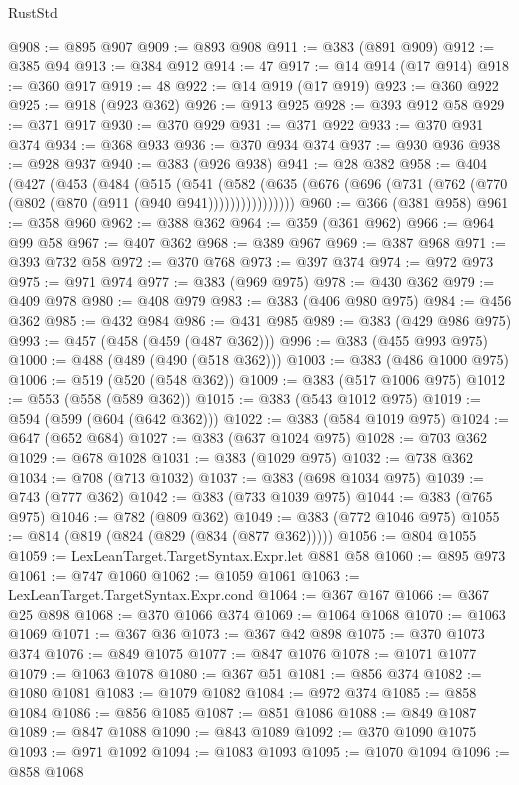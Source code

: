 \begin{lexlean}{RustStd}
\begin{coremodule}
{\begin{coremodule}
{{{{{{{{{{{{{{{{@908 := @895 @907
@909 := @893 @908
@911 := @383 (@891 @909)
@912 := @385 @94
@913 := @384 @912
@914 := 47
@917 := @14 @914 (@17 @914)
@918 := @360 @917
@919 := 48
@922 := @14 @919 (@17 @919)
@923 := @360 @922
@925 := @918 (@923 @362)
@926 := @913 @925
@928 := @393 @912 @58
@929 := @371 @917
@930 := @370 @929
@931 := @371 @922
@933 := @370 @931 @374
@934 := @368 @933
@936 := @370 @934 @374
@937 := @930 @936
@938 := @928 @937
@940 := @383 (@926 @938)
@941 := @28 @382
@958 := @404
    (@427
      (@453
        (@484
          (@515
            (@541
              (@582 (@635 (@676 (@696 (@731 (@762 (@770 (@802 (@870 (@911 (@940 @941))))))))))))))))
@960 := @366 (@381 @958)
@961 := @358 @960
@962 := @388 @362
@964 := @359 (@361 @962)
@966 := @964 @99 @58
@967 := @407 @362
@968 := @389 @967
@969 := @387 @968
@971 := @393 @732 @58
@972 := @370 @768
@973 := @397 @374
@974 := @972 @973
@975 := @971 @974
@977 := @383 (@969 @975)
@978 := @430 @362
@979 := @409 @978
@980 := @408 @979
@983 := @383 (@406 @980 @975)
@984 := @456 @362
@985 := @432 @984
@986 := @431 @985
@989 := @383 (@429 @986 @975)
@993 := @457 (@458 (@459 (@487 @362)))
@996 := @383 (@455 @993 @975)
@1000 := @488 (@489 (@490 (@518 @362)))
@1003 := @383 (@486 @1000 @975)
@1006 := @519 (@520 (@548 @362))
@1009 := @383 (@517 @1006 @975)
@1012 := @553 (@558 (@589 @362))
@1015 := @383 (@543 @1012 @975)
@1019 := @594 (@599 (@604 (@642 @362)))
@1022 := @383 (@584 @1019 @975)
@1024 := @647 (@652 @684)
@1027 := @383 (@637 @1024 @975)
@1028 := @703 @362
@1029 := @678 @1028
@1031 := @383 (@1029 @975)
@1032 := @738 @362
@1034 := @708 (@713 @1032)
@1037 := @383 (@698 @1034 @975)
@1039 := @743 (@777 @362)
@1042 := @383 (@733 @1039 @975)
@1044 := @383 (@765 @975)
@1046 := @782 (@809 @362)
@1049 := @383 (@772 @1046 @975)
@1055 := @814 (@819 (@824 (@829 (@834 (@877 @362)))))
@1056 := @804 @1055
@1059 := LexLeanTarget.TargetSyntax.Expr.let @881 @58
@1060 := @895 @973
@1061 := @747 @1060
@1062 := @1059 @1061
@1063 := LexLeanTarget.TargetSyntax.Expr.cond
@1064 := @367 @167
@1066 := @367 @25 @898
@1068 := @370 @1066 @374
@1069 := @1064 @1068
@1070 := @1063 @1069
@1071 := @367 @36
@1073 := @367 @42 @898
@1075 := @370 @1073 @374
@1076 := @849 @1075
@1077 := @847 @1076
@1078 := @1071 @1077
@1079 := @1063 @1078
@1080 := @367 @51
@1081 := @856 @374
@1082 := @1080 @1081
@1083 := @1079 @1082
@1084 := @972 @374
@1085 := @858 @1084
@1086 := @856 @1085
@1087 := @851 @1086
@1088 := @849 @1087
@1089 := @847 @1088
@1090 := @843 @1089
@1092 := @370 @1090 @1075
@1093 := @971 @1092
@1094 := @1083 @1093
@1095 := @1070 @1094
@1096 := @858 @1068
}}}}}}}}}}}}}}}}
\end{coremodule}}
\end{coremodule}
\end{lexlean}
